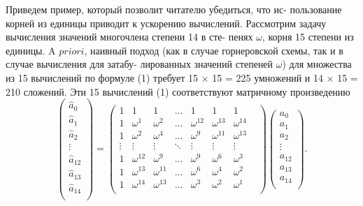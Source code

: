 Приведем пример, который позволит читателю убедиться, что ис­- \linebreak
пользование корней из единицы приводит к ускорению вычислений. \linebreak
Рассмотрим задачу вычисления значений многочлена степени 14 в сте­- \linebreak
пенях $\omega$,  корня 15 степени из единицы. A $priori$, наивный подход (как \linebreak
в случае горнеровской схемы, так и в случае вычисления для затабу- \linebreak
лированных значений степеней $\omega$)  для множества из 15 вычислений по \linebreak
формуле (1) требует 15 $\times$ 15 = 225 умножений и 14 $\times$ 15 = 210 сложений. \linebreak
Эти 15 вычислений (1) соответствуют матричному произведению
\[
\begin{pmatrix}
 \hat a_0 \\
 \hat a_1 \\
 \hat a_2 \\
 \vdots  \\
 \hat a_{12} \\
 \hat a_{13} \\
 \hat a_{14} \\  
\end{pmatrix} =
\begin{pmatrix}
 1 & 1 & 1 & \hdots & 1 & 1 & 1 \\
 1 & \omega^1 & \omega^2 & \hdots & \omega^{12} & \omega^{13} & \omega^{14} & \\
 1 & \omega^2 & \omega^4 & \hdots & \omega^9 & \omega^{11} & \omega^{13} & \\
 \vdots & \vdots &\vdots & \ddots & \vdots & \vdots & \vdots & \\
 1 & \omega^{12} & \omega^9 & \hdots & \omega^9 & \omega^6 & \omega^3 & \\
 1 & \omega^{13} & \omega^{11} & \hdots & \omega^6 & \omega^4 & \omega^2 & \\
 1 & \omega^{14} & \omega^{13} & \hdots & \omega^3 & \omega^2 & \omega^1 & \\
\end{pmatrix}
\begin{pmatrix}
 a_0 \\
 a_1 \\
 a_2 \\
 \vdots  \\
 a_{12} \\
 a_{13} \\
 a_{14} \\  
\end{pmatrix}.
\] 
